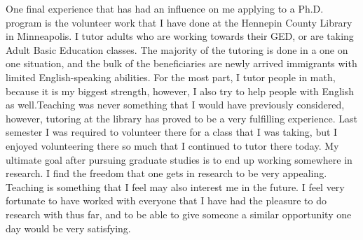 \documentclass[a4paper,12pt]{article}
\newcommand{\tab}{\hspace*{2em}}
\begin{document}
\tab One final experience that has had an influence on me applying to a Ph.D. program is the volunteer work that I have done at the Hennepin County Library in Minneapolis. I tutor adults who are working towards their GED, or are taking Adult Basic Education classes.  The majority of the tutoring is done in a one on one situation, and the bulk of the beneficiaries are newly arrived immigrants with limited English-speaking abilities.  For the most part, I tutor people in math, because it is my biggest strength, however, I also try to help people with English as well.Teaching was never something that I would have previously considered, however, tutoring at the library has proved to be a very fulfilling experience.  Last semester I was required to volunteer there for a class that I was taking, but I enjoyed volunteering there so much that I continued to tutor there today.  \newline
\tab My ultimate goal after pursuing graduate studies is to end up working somewhere in research.  I find the freedom that one gets in research to be very appealing.  Teaching is something that I feel may also interest me in the future.  I feel very fortunate to have worked with everyone that I have had the pleasure to do research with thus far, and to be able to give someone a similar opportunity one day would be very satisfying.
\end{document}
